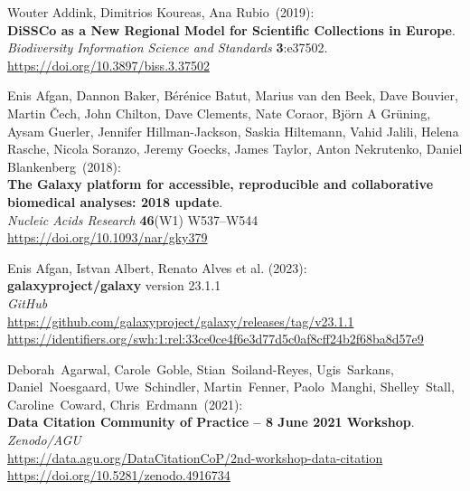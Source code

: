 
\makeatletter
{}

\begin{thebibliography}{9}

\small

Wouter Addink, Dimitrios Koureas, Ana Rubio~(2019):\\
\textbf{DiSSCo as a New Regional Model for Scientific Collections in Europe}.\\
\emph{Biodiversity Information Science and Standards}
\textbf{3}:e37502.\\
\url{https://doi.org/10.3897/biss.3.37502}

Enis Afgan, Dannon Baker, Bérénice Batut, Marius van
den Beek, Dave Bouvier, Martin Čech, John Chilton, Dave Clements, Nate
Coraor, Björn A Grüning, Aysam Guerler, Jennifer Hillman-Jackson, Saskia
Hiltemann, Vahid Jalili, Helena Rasche, Nicola Soranzo, Jeremy Goecks,
James Taylor, Anton Nekrutenko, Daniel Blankenberg~(2018):\\
\textbf{The Galaxy platform for accessible, reproducible and
collaborative biomedical analyses: 2018 update}.\\
\emph{Nucleic Acids Research} \textbf{46}(W1) W537--W544\\
\url{https://doi.org/10.1093/nar/gky379}

Enis Afgan, Istvan Albert, Renato Alves et al. (2023):\\
\textbf{galaxyproject/galaxy} version 23.1.1\\
\emph{GitHub}\\
\url{https://github.com/galaxyproject/galaxy/releases/tag/v23.1.1}\\
\url{https://identifiers.org/swh:1:rel:33ce0ce4f6e3d77d5c0af8cff24b2f68ba8d57e9}

Deborah~Agarwal, Carole~Goble, Stian~Soiland-Reyes,
Ugis~Sarkans, Daniel~Noesgaard, Uwe~Schindler, Martin~Fenner,
Paolo~Manghi, Shelley~Stall, Caroline~Coward, Chris~Erdmann~(2021):\\
\textbf{Data Citation Community of Practice -- 8 June 2021 Workshop}.\\
\emph{Zenodo/AGU}\\
\url{https://data.agu.org/DataCitationCoP/2nd-workshop-data-citation}\\
\url{https://doi.org/10.5281/zenodo.4916734}


\end{thebibliography}
